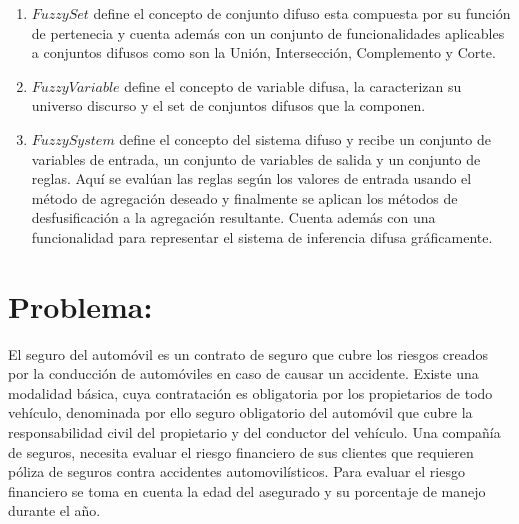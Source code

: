 \documentclass[10pt,letterpaper]{article}
\begin{document}
\begin{enumerate}
	\item[] $FuzzySet$ define el concepto de conjunto difuso esta compuesta por su función de pertenecia y cuenta además con un conjunto de funcionalidades aplicables a conjuntos difusos como son la Unión, Intersección, Complemento y Corte.
	
	\item[] $FuzzyVariable$ define el concepto de variable difusa, la caracterizan su universo discurso y el set de conjuntos difusos que la componen.
	
	\item[] $FuzzySystem$ define el concepto del sistema difuso y recibe un conjunto de variables de entrada, un conjunto de variables de salida y un conjunto de reglas. Aquí se evalúan las reglas según los valores de entrada usando el método de agregación deseado y finalmente se aplican los métodos de desfusificación a la agregación resultante. Cuenta además con una funcionalidad para representar el sistema de inferencia difusa gráficamente.
\end{enumerate}


\section{Problema:}
El seguro del automóvil es un contrato de seguro que cubre los riesgos creados por la conducción de automóviles en caso de causar un accidente. Existe una modalidad básica, cuya contratación es obligatoria por los propietarios de todo vehículo, denominada por ello seguro obligatorio del automóvil que cubre la responsabilidad civil del propietario y del conductor del vehículo. Una compañía de seguros, necesita evaluar el riesgo financiero de sus clientes que requieren póliza de seguros contra accidentes automovilísticos. Para evaluar el riesgo financiero se toma en cuenta la edad del asegurado y su porcentaje de manejo durante el año.
\end{document}
